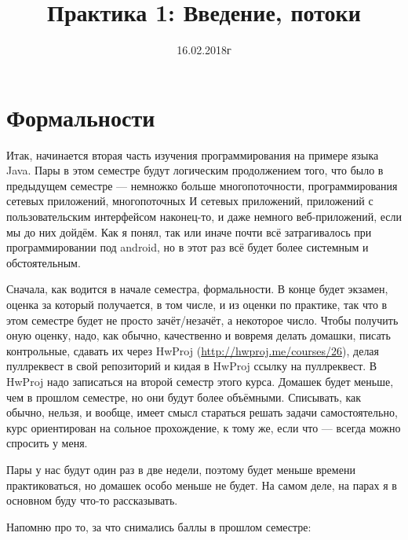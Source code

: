 \documentclass[a5paper]{article}
\title{Практика 1: Введение, потоки}
\date{16.02.2018г}
\begin{document}
\maketitle
\thispagestyle{empty}

\section{Формальности}
Итак, начинается вторая часть изучения программирования на примере языка Java. Пары в этом семестре будут логическим продолжением того, что было в предыдущем семестре --- немножко больше многопоточности, программирования сетевых приложений, многопоточных И сетевых приложений, приложений с пользовательским интерфейсом наконец-то, и даже немного веб-приложений, если мы до них дойдём. Как я понял, так или иначе почти всё затрагивалось при программировании под android, но в этот раз всё будет более системным и обстоятельным.

Сначала, как водится в начале семестра, формальности. В конце будет экзамен, оценка за который получается, в том числе, и из оценки по практике, так что в этом семестре будет не просто зачёт/незачёт, а некоторое число. Чтобы получить оную оценку, надо, как обычно, качественно и вовремя делать домашки, писать контрольные, сдавать их через HwProj (\url{http://hwproj.me/courses/26}), делая пуллреквест в свой репозиторий и кидая в HwProj ссылку на пуллреквест. В HwProj надо записаться на второй семестр этого курса. Домашек будет меньше, чем в прошлом семестре, но они будут более объёмными. Списывать, как обычно, нельзя, и вообще, имеет смысл стараться решать задачи самостоятельно, курс ориентирован на сольное прохождение, к тому же, если что --- всегда можно спросить у меня.

Пары у нас будут один раз в две недели, поэтому будет меньше времени практиковаться, но домашек особо меньше не будет. На самом деле, на парах я в основном буду что-то рассказывать.

Напомню про то, за что снимались баллы в прошлом семестре:\nopagebreak
\end{document}
